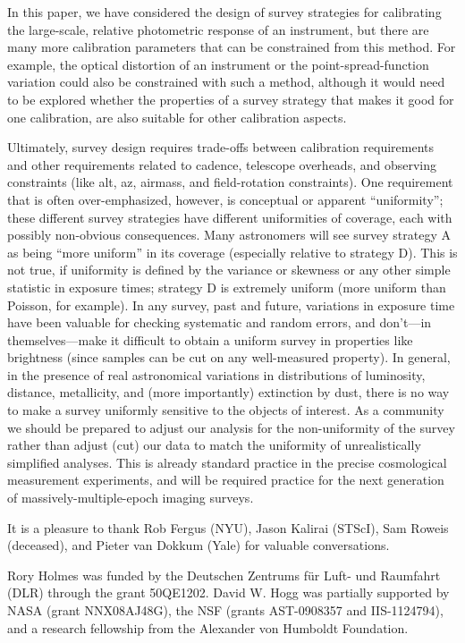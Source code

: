 \documentclass[preprint,pdftex]{aastex}
\begin{document}
In this paper, we have considered the design of survey strategies for calibrating the large-scale, relative photometric response of an instrument, but there are many more calibration parameters that can be constrained from this method. For example, the optical distortion of an instrument or the point-spread-function variation could also be constrained with such a method, although it would need to be explored whether the properties of a survey strategy that makes it good for one calibration, are also suitable for other calibration aspects.

Ultimately, survey design requires trade-offs between calibration requirements and other requirements related to cadence, telescope overheads, and observing constraints (like alt, az, airmass, and field-rotation constraints).  One requirement that is often over-emphasized, however, is conceptual or apparent ``uniformity''; these different survey strategies have different uniformities of coverage, each with possibly non-obvious consequences.  Many astronomers will see survey strategy A as being ``more uniform'' in its coverage (especially relative to strategy D).  This is not true, if uniformity is defined by the variance or skewness or any other simple statistic in exposure times; strategy D is extremely uniform (more
uniform than Poisson, for example).  In any survey, past and future, variations in exposure time have been valuable for checking systematic and random errors, and don't---in themselves---make it difficult to obtain a uniform survey in properties like brightness (since samples can be cut on any well-measured property).  In general, in the presence of real astronomical variations in distributions of luminosity, distance, metallicity, and (more importantly) extinction by dust, there is no way to make a survey uniformly sensitive to the objects of interest.  As a community we should be prepared to adjust our analysis for the non-uniformity of the survey rather than adjust (cut) our data to match the uniformity of unrealistically simplified analyses.  This is already standard practice in the precise cosmological measurement experiments, and will be required practice for the next generation of massively-multiple-epoch imaging surveys.

\acknowledgments
It is a pleasure to thank Rob Fergus (NYU), Jason Kalirai (STScI), Sam Roweis (deceased), and Pieter van Dokkum (Yale) for valuable conversations. 

Rory Holmes was funded by the Deutschen Zentrums f\"ur Luft- und Raumfahrt
(DLR) through the grant 50QE1202.  David W. Hogg was partially supported by NASA
(grant NNX08AJ48G), the NSF (grants AST-0908357 and IIS-1124794), and
a research fellowship from the Alexander von Humboldt Foundation.
\end{document}
